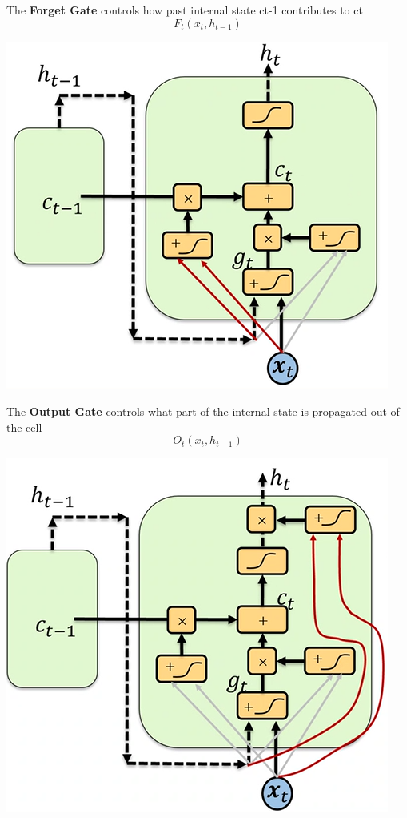 \documentclass[10pt]{report}
\begin{document}
The \textbf{Forget Gate} controls how past internal state ct-1 contributes to ct $$F_t(x_t,h_{t-1})$$
\begin{center}
	\includegraphics[scale=0.5]{96.png}
\end{center}
The \textbf{Output Gate} controls what part of the internal state is propagated out of the cell $$O_t(x_t,h_{t-1})$$
\begin{center}
	\includegraphics[scale=0.5]{97.png}
\end{center}
\end{document}
